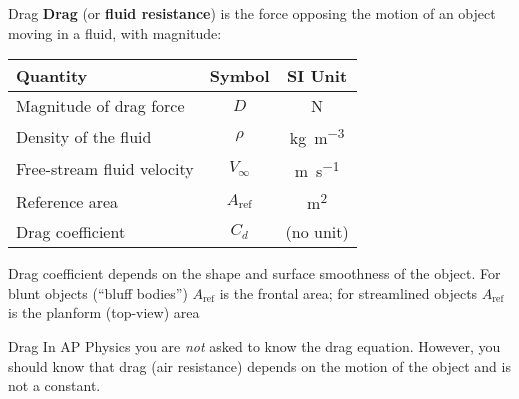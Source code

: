 \documentclass[12pt,compress,aspectratio=169]{beamer}
\newcommand{\eq}[2]{\vspace{#1}{\Large\begin{displaymath}#2\end{displaymath}}}
\begin{document}
\begin{frame}{Drag}
  \textbf{Drag} (or \textbf{fluid resistance}) is the force opposing the
  motion of an object moving in a fluid, with magnitude:

  \eq{-.2in}{
    D=\frac12\rho V_\infty^2A_\text{ref}C_d
  }  
  \begin{center}
    \begin{tabular}{l|c|c}
      \rowcolor{pink}
      \textbf{Quantity} & \textbf{Symbol} & \textbf{SI Unit} \\ \hline
      Magnitude of drag force & $D$  & \si{\newton}\\
      Density of the fluid & $\rho$ & \si{\kilo\gram\per\metre\cubed}\\
      Free-stream fluid velocity & $V_\infty$ & \si{\metre\per\second}\\
      Reference area   & $A_\text{ref}$ & \si{\metre\squared}\\
      Drag coefficient & $C_d$ & (no unit)
    \end{tabular}
  \end{center}

  Drag coefficient depends on the shape and surface smoothness of the object.
  For blunt objects (``bluff bodies'') $A_\text{ref}$ is the frontal area; for
  streamlined objects $A_\text{ref}$ is the planform (top-view) area
\end{frame}



\begin{frame}{Drag}
  In AP Physics you are \emph{not} asked to know the drag equation. However,
  you should know that drag (air resistance) depends on the motion of the
  object and is not a constant.
\end{frame}
\end{document}
